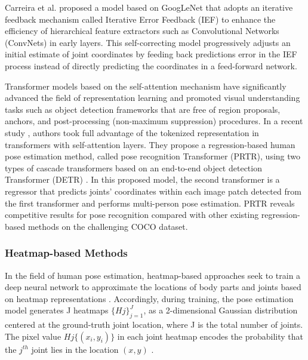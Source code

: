 Carreira et al. \cite{carreira_human_2016} proposed a model based on GoogLeNet \cite{szegedy_going_2014} that adopts an iterative feedback mechanism called Iterative Error Feedback (IEF) to enhance the efficiency of hierarchical feature extractors such as Convolutional Networks (ConvNets) in early layers. This self-correcting model progressively adjusts an initial estimate of joint coordinates by feeding back predictions error in the IEF process instead of directly predicting the coordinates in a feed-forward network.

Transformer models \cite{vaswani_attention_2017} based on the self-attention mechanism have significantly advanced the field of representation learning and promoted visual understanding tasks such as object detection frameworks that are free of region proposals, anchors, and post-processing (non-maximum suppression) procedures. In a recent study \cite{li_pose_2021}, authors took full advantage of the tokenized representation in transformers with self-attention layers. They propose a regression-based human pose estimation method, called pose recognition Transformer (PRTR), using two types of cascade transformers based on an end-to-end object detection Transformer (DETR) \cite{carion_end--end_2020}. In this proposed model, the second transformer is a regressor that predicts joints' coordinates within each image patch detected from the first transformer and performs multi-person pose estimation. PRTR reveals competitive results for pose recognition compared with other existing regression-based methods on the challenging COCO dataset.


\subsubsection{Heatmap-based Methods}

In the field of human pose estimation, heatmap-based approaches seek to train a deep neural network to approximate the locations of body parts and joints based on heatmap representations \cite{chen_articulated_2014, newell_stacked_2016, wei_convolutional_2016}. Accordingly, during training, the pose estimation model generates J heatmaps $\{Hj\}_{j=1}^J$, as a 2-dimensional Gaussian distribution centered at the ground-truth joint location, where J is the total number of joints. The pixel value $Hj \{(x_i,y_i)\}$ in each joint heatmap encodes the probability that the $j^{th}$ joint lies in the location $(x,y)$  \cite{tompson_efficient_2015, tompson_joint_2014}. 

